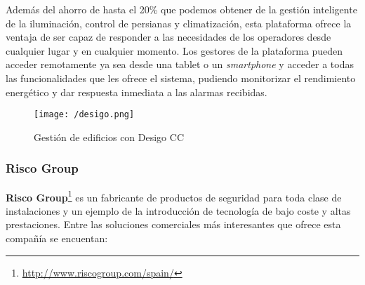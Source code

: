 Además del ahorro de hasta el 20\% que podemos obtener de la gestión inteligente de la iluminación, control de persianas y climatización, esta plataforma ofrece la ventaja de ser capaz de responder a las necesidades de los operadores desde cualquier lugar y en cualquier momento. Los gestores de la plataforma pueden acceder remotamente ya sea desde una tablet o un \textit{smartphone} y acceder a todas las funcionalidades que les ofrece el sistema, pudiendo monitorizar el rendimiento energético y dar respuesta inmediata a las alarmas recibidas.

\begin{figure}[!h]
\centering
\texttt{[image: /desigo.png]}
\caption{Gestión de edificios con Desigo CC~\cite{Desigo_Img}}
\label{fig:desigo}
\end{figure}

\subsubsection{Risco Group}

\textbf{Risco Group}\footnote{\url{http://www.riscogroup.com/spain/}} es un fabricante de productos de seguridad para toda clase de instalaciones y un ejemplo de la introducción de tecnología de bajo coste y altas prestaciones. Entre las soluciones comerciales más interesantes que ofrece esta compañía se encuentan:

